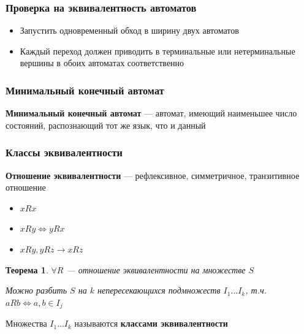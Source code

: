 \documentclass{beamer}
\newtheorem{rutheorem}{Теорема}
\def\iff{\Leftrightarrow}
\begin{document}
\begin{frame}[fragile]
  \transwipe[direction=90]
  \frametitle{Проверка на эквивалентность автоматов}
  \begin{itemize}
    \item Запустить одновременный обход в ширину двух автоматов
    \item Каждый переход должен приводить в терминальные или нетерминальные вершины в обоих автоматах соответственно
  \end{itemize}
\end{frame}

\begin{frame}[fragile]
  \transwipe[direction=90]
  \frametitle{Минимальный конечный автомат}
   \textbf{Минимальный конечный автомат} --- автомат, имеющий наименьшее число состояний, распознающий тот же язык, что и данный
\end{frame}

\begin{frame}[fragile]
  \transwipe[direction=90]
  \frametitle{Классы эквивалентности}
    \textbf{Отношение эквивалентности} --- рефлексивное, симметричное, транзитивное отношение
    \begin{itemize}
      \item $xRx$
      \item $xRy \iff yRx$
      \item $xRy, yRz \to xRz$
    \end{itemize}

    \begin{rutheorem}
       $\forall R$ --- отношение эквивалентности на множестве $S$

      Можно разбить $S$ на $k$ непересекающихся подмножеств $I_1 \dots I_k$, т.ч. $aRb \iff a, b \in I_j$
    \end{rutheorem}


\begin{center}
      Множества $I_1 \dots I_k$ называются \textbf{классами эквивалентности}
\end{center}
\end{frame}
\end{document}
